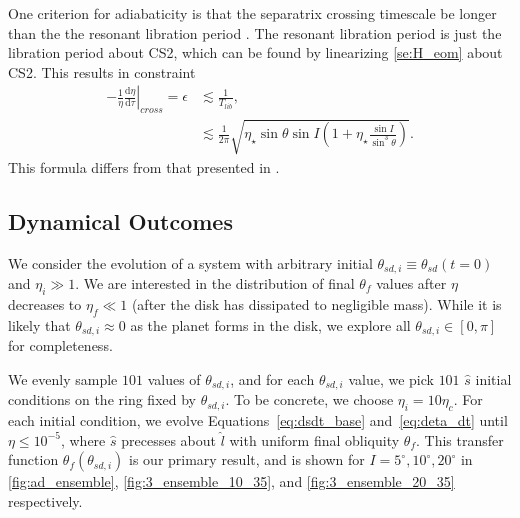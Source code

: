 \documentclass[
        fleqn,
        usenatbib,
    ]{mnras}
\newcommand*{\rd}[2]{\frac{\mathrm{d}#1}{\mathrm{d}#2}}
\newcommand*{\at}[1]{\left.#1\right|}
\newcommand*{\p}[1]{\left(#1\right)}
\begin{document}
One criterion for adiabaticity is that the separatrix crossing timescale be
longer than the the resonant libration period \citep{ward2004I}. The resonant
libration period is just the libration period about CS2, which can be found by
linearizing \autoref{se:H_eom} about CS2. This results in constraint
\begin{align}
    -\at{\frac{1}{\eta}\rd{\eta}{\tau}}_{cross} = \epsilon &\lesssim
            \frac{1}{T_{lib}},\\
        &\lesssim \frac{1}{2\pi}\sqrt{\eta_\star\sin\theta \sin I
            \p{1 + \eta_\star \frac{\sin I}{\sin^3\theta}}}.\label{eq:ad_constr}
\end{align}
This formula differs from that presented in \citealt{millholland_disk}.

\subsection{Dynamical Outcomes}\label{ss:ad_ensemble}

We consider the evolution of a system with arbitrary initial $\theta_{sd, i}
\equiv \theta_{sd}\p{t = 0}$ and $\eta_i \gg 1$. We are interested in the
distribution of final $\theta_f$ values after $\eta$ decreases to $\eta_f \ll 1$
(after the disk has dissipated to negligible mass). While it is likely that
$\theta_{sd, i} \approx 0$ as the planet forms in the disk, we explore all
$\theta_{sd, i} \in [0, \pi]$ for completeness.

We evenly sample $101$ values of $\theta_{sd, i}$, and for each $\theta_{sd, i}$
value, we pick $101$ $\hat{s}$ initial conditions on the ring fixed by
$\theta_{sd, i}$. To be concrete, we choose $\eta_i = 10\eta_c$. For each
initial condition, we evolve Equations~\ref{eq:dsdt_base} and~\ref{eq:deta_dt}
until $\eta \leq 10^{-5}$, where $\hat{s}$ precesses about $\hat{l}$ with
uniform final obliquity $\theta_f$. This transfer function
$\theta_f\p{\theta_{sd, i}}$ is our primary result, and is shown for $I =
5^\circ, 10^\circ, 20^\circ$ in \autoref{fig:ad_ensemble},
\autoref{fig:3_ensemble_10_35}, and \autoref{fig:3_ensemble_20_35} respectively.
\end{document}
